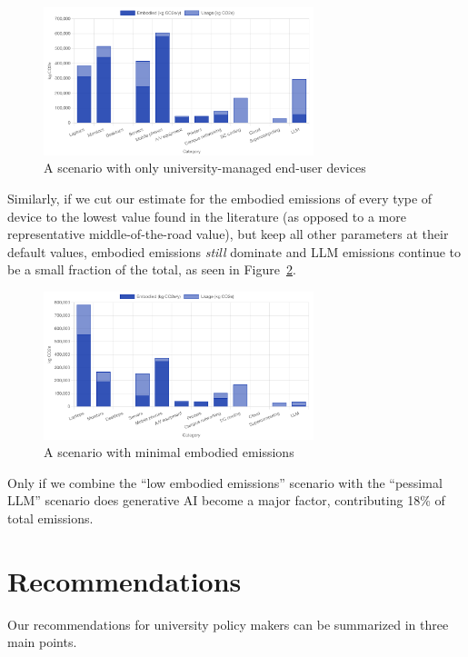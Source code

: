 \documentclass[11pt]{article}
\begin{document}
\begin{figure}[h]
  \centering
  \includegraphics[width=0.7\textwidth]{fig-sens1.png}
  \caption{A scenario with only university-managed end-user devices}
  \label{fig:sens1}
\end{figure}

Similarly, if we cut our estimate for the embodied emissions of every type of device to the lowest value found in the literature (as opposed to a more representative middle-of-the-road value), but keep all other parameters at their default values, embodied emissions {\em still} dominate and LLM emissions continue to be a small fraction of the total, as seen in Figure~\ref{fig:sens2}.

\begin{figure}[h]
  \centering
  \includegraphics[width=0.7\textwidth]{fig-sens2.png}
  \caption{A scenario with minimal embodied emissions}
  \label{fig:sens2}
\end{figure}

Only if we combine the ``low embodied emissions'' scenario with the ``pessimal LLM'' scenario does generative AI become a major factor, contributing 18\% of total emissions.

\section{Recommendations}
\label{sec:recommendations}

Our recommendations for university policy makers can be summarized in three main points.
\end{document}
